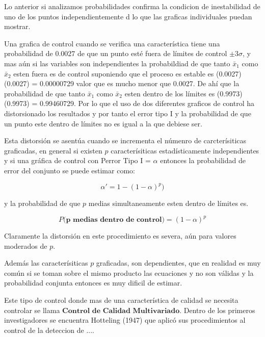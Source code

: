 \documentclass[english]{report}
\begin{document}
Lo anterior si analizamos probabilidades confirma la condicion de inestabilidad de uno de los puntos independientemente d lo que las graficas individuales puedan mostrar.

Una grafica de control cuando se verifica una característica tiene una probabilidad de 0.0027 de que un punto esté fuera de límites de control $\pm 3 \sigma$, y mas aún si las variables son independientes la probabildiad de que tanto $\bar{x}_1$ como $\bar{x}_2$ esten fuera es de control suponiendo que el proceso es estable es (0.0027)(0.0027) = 0.00000729 valor que es mucho menor que 0.0027. De ahí que la probabilidad de que tanto  $\bar{x}_1$ como $\bar{x}_2$ esten dentro de los límites es (0.9973)(0.9973) = 0.99460729. Por lo que el uso de dos diferentes graficos de control ha distorsionado los resultados y por tanto el error tipo I y la probabilidad de que un punto este dentro de límites no es igual a la que debiese ser.

Esta distorsión se asentúa cuando se incrementa el númenro de carcterísiticas graficadas, en general si existen $p$ caracterísiticas estadísticamente independientes y si una gráfica de control con P{error Tipo I} = $\alpha$ entonces la probabilidad de error del conjunto se puede estimar como:

\begin{equation}
\alpha'=1-(1-\alpha)^p)
\label{c2eq17}
\end{equation}
 

y la probabilidad de que $p$ medias simultaneamente esten dentro de límites es.

\begin{equation}
P\textbf{(p medias dentro de control)} = (1-\alpha)^p
\label{c2eq18}
\end{equation}
  
 
Claramente la distorsión en este procedimiento es severa, aún para valores moderados de $p$.

Además las caracterísiticas $p$ graficadas, son dependientes, que en realidad es muy común si se toman sobre el mismo producto las ecuaciones \label{c2eq17} y \label{c2eq18} no son válidas y la probabilidad conjunta entonces es muy dificil de estimar.

Este tipo de control donde mas de una característica de calidad se necesita controlar se llama $\textbf{Control de Calidad Multivariado}$. Dentro de los primeros investigadores se encuentra Hotteling (1947) que aplicó sus procedimientos al control de la deteccion de ....
\end{document}
